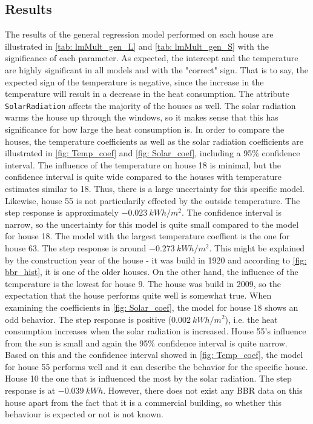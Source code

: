 \subsection{Results}
The results of the general regression model performed on each house are illustrated in \cref{tab: lmMult_gen_L} and \cref{tab: lmMult_gen_S} with the significance of each parameter. As expected, the intercept and the temperature are highly significant in all models and with the "correct" sign. That is to say, the expected sign of the temperature is negative, since the increase in the temperature will result in a decrease in the heat consumption. The attribute \texttt{SolarRadiation} affects the majority of the houses as well. The solar radiation warms the house up through the windows, so it makes sense that this has significance for how large the heat consumption is. In order to compare the houses, the temperature coefficients as well as the solar radiation coefficients are illustrated in \cref{fig: Temp_coef} and \cref{fig: Solar_coef}, including a 95\% confidence interval. The influence of the temperature on house 18 is minimal, but the confidence interval is quite wide compared to the houses with temperature estimates similar to 18. Thus, there is a large uncertainty for this specific model. Likewise, house 55 is not particularily effected by the outside temperature. The step response is approximately $-0.023 \ kWh/m^2$. The confidence interval is narrow, so the uncertainty for this model is quite small compared to the model for house 18. The model with the largest temperature coeffient is the one for house 63. The step response is around $-0.273 \ kWh/m^2$. This might be explained by the construction year of the house - it was build in 1920 and according to \cref{fig: bbr_hist}, it is one of the older houses. On the other hand, the influence of the temperature is the lowest for house 9. The house was build in 2009, so the expectation that the house performs quite well is somewhat true. When examining the coefficients in \cref{fig: Solar_coef}, the model for house 18 shows an odd behavior. The step response is positive ($0.002 \ kWh/m^2$), i.e. the heat consumption increases when the solar radiation is increased. House 55's influence from the sun is small and again the 95\% confidence interval is quite narrow. Based on this and the confidence interval showed in \cref{fig: Temp_coef}, the model for house 55 performs well and it can describe the behavior for the specific house. House 10 the one that is influenced the most by the solar radiation. The step response is at $-0.039 \ kWh$. However, there does not exist any BBR data on this house apart from the fact that it is a commercial building, so whether this behaviour is expected or not is not known.\\ 

